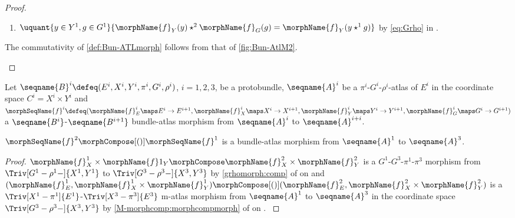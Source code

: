 \documentclass{article}
\begin{document}
\begin{lemma}
\begin{proof}
\begin{enumerate}
\begin{description}
\begin{enumerate}
\item
$
  \uquant
    {{y \in Y^1},{g \in G^1}}
    {{
      \morphName{f}_Y(y) \star^2 \morphName{f}_G(g) =
      \morphName{f}_Y(y \star^1 g)
    }}
$
by \cref{eq:Grho} in
{
  \showlabelsinline
  .
}
\end{enumerate}

\item[Commutation relation of charts:]
The commutativity of \cref{def:Bun-ATLmorph} follows from that of
\cref{fig:Bun-AtlM2}.
\end{description}
\end{enumerate}
\end{proof}
\end{lemma}

\begin{corollary}
\label{cor:Bun-ATLmorph}
Let
$
  \seqname{B}^i
  \defeq
  (
    E^i,
    X^i,
    Y^i,
    \pi^i,
    G^i,
    \rho^i
  )
$,
$i=1,2,3$, be a protobundle,
$\seqname{A}^i$ be a $\pi^i$-$G^i$-$\rho^i$-atlas of $E^i$ in the
coordinate space $C^i = X^i \times Y^i$ and
$
  \morphSeqName{f}^i
  \defeq
  (
    \morphName{f}^i_E \maps E^i \to E^{i+1},
    \morphName{f}^i_X \maps X^i \to X^{i+1},
    \morphName{f}^i_Y \maps Y^i \to Y^{i+1},
    \morphName{f}^i_G \maps G^i \to G^{i+1}
  )
$
a $\seqname{B^i}$-$\seqname{B^{i+1}}$ bundle-atlas morphism from
$\seqname{A}^i$ to $\seqname{A}^{i+i}$.

$\morphSeqName{f}^2 \morphCompose[()] \morphSeqName{f}^1$ is a bundle-atlas
morphism from $\seqname{A}^1$ to $\seqname{A}^3$.

\begin{proof}
$
  \morphName{f}^1_X \times \morphName{f} 1_Y \morphCompose
  \morphName{f}^2_X \times \morphName{f}^2_Y
$
is a $G^1$-$G^3$-$\pi^1$-$\pi^3$ morphism from
$\Triv[G^1-\rho^1-]{X^1,Y^1}$ to $\Triv[G^3-\rho^3-]{X^3,Y^3}$ by
\cref{grhomorph:comp} of
{
  \showlabelsinline
   on
}
and
$
  (\morphName{f}^1_E, \morphName{f}^1_X \times \morphName{f}^1_Y)
  \morphCompose[()]
  (\morphName{f}^2_E, \morphName{f}^2_X \times \morphName{f}^2_Y)
$
is a $\Triv[X^1-\pi^1]{E^1}$-$\Triv[X^3-\pi^3]{E^3 }$ m-atlas morphism
from $\seqname{A}^1$ to $\seqname{A}^3$ in the coordinate space
$\Triv[G^3-\rho^3-]{X^3,Y^3}$ by \cref{M-morphcomp:morphcompmorph} of
{
  \showlabelsinline
   on
  .
}
\end{proof}
\end{corollary}
\end{document}
